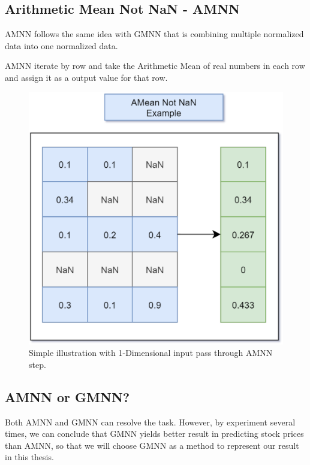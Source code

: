 \subsection{Arithmetic Mean Not NaN - AMNN}
AMNN follows the same idea with GMNN that is combining multiple normalized data into
one normalized data.

AMNN iterate by row and take the Arithmetic Mean of real numbers in each row and
assign it as a output value for that row.

\begin{figure}[H]
	\centering
	\includegraphics[width=0.7\linewidth]{images/amnn.eps}
	\caption{Simple illustration with 1-Dimensional input pass through AMNN step.}
	\label{fig:amnn}
\end{figure}

\subsection{AMNN or GMNN?}
Both AMNN and GMNN can resolve the task. However, by experiment several times, we
can conclude that GMNN yields better result in predicting stock prices than AMNN,
so that we will choose GMNN as a method to represent our result in this thesis.